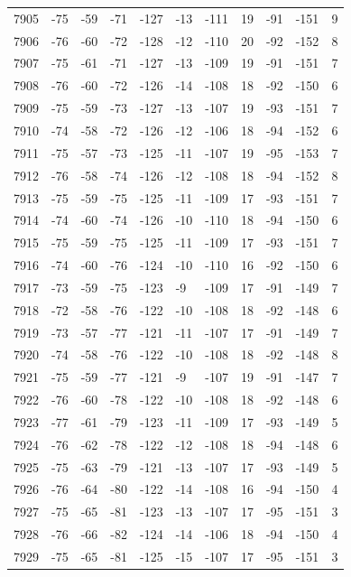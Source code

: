 \begin{table}[H]
\begin{tabular}{lllllllllll}
7905 & -75 & -59 & -71 & -127 & -13 & -111 & 19 & -91 & -151 & 9 \\
7906 & -76 & -60 & -72 & -128 & -12 & -110 & 20 & -92 & -152 & 8 \\
7907 & -75 & -61 & -71 & -127 & -13 & -109 & 19 & -91 & -151 & 7 \\
7908 & -76 & -60 & -72 & -126 & -14 & -108 & 18 & -92 & -150 & 6 \\
7909 & -75 & -59 & -73 & -127 & -13 & -107 & 19 & -93 & -151 & 7 \\
7910 & -74 & -58 & -72 & -126 & -12 & -106 & 18 & -94 & -152 & 6 \\
7911 & -75 & -57 & -73 & -125 & -11 & -107 & 19 & -95 & -153 & 7 \\
7912 & -76 & -58 & -74 & -126 & -12 & -108 & 18 & -94 & -152 & 8 \\
7913 & -75 & -59 & -75 & -125 & -11 & -109 & 17 & -93 & -151 & 7 \\
7914 & -74 & -60 & -74 & -126 & -10 & -110 & 18 & -94 & -150 & 6 \\
7915 & -75 & -59 & -75 & -125 & -11 & -109 & 17 & -93 & -151 & 7 \\
7916 & -74 & -60 & -76 & -124 & -10 & -110 & 16 & -92 & -150 & 6 \\
7917 & -73 & -59 & -75 & -123 & -9 & -109 & 17 & -91 & -149 & 7 \\
7918 & -72 & -58 & -76 & -122 & -10 & -108 & 18 & -92 & -148 & 6 \\
7919 & -73 & -57 & -77 & -121 & -11 & -107 & 17 & -91 & -149 & 7 \\
7920 & -74 & -58 & -76 & -122 & -10 & -108 & 18 & -92 & -148 & 8 \\
7921 & -75 & -59 & -77 & -121 & -9 & -107 & 19 & -91 & -147 & 7 \\
7922 & -76 & -60 & -78 & -122 & -10 & -108 & 18 & -92 & -148 & 6 \\
7923 & -77 & -61 & -79 & -123 & -11 & -109 & 17 & -93 & -149 & 5 \\
7924 & -76 & -62 & -78 & -122 & -12 & -108 & 18 & -94 & -148 & 6 \\
7925 & -75 & -63 & -79 & -121 & -13 & -107 & 17 & -93 & -149 & 5 \\
7926 & -76 & -64 & -80 & -122 & -14 & -108 & 16 & -94 & -150 & 4 \\
7927 & -75 & -65 & -81 & -123 & -13 & -107 & 17 & -95 & -151 & 3 \\
7928 & -76 & -66 & -82 & -124 & -14 & -106 & 18 & -94 & -150 & 4 \\
7929 & -75 & -65 & -81 & -125 & -15 & -107 & 17 & -95 & -151 & 3 \\

\end{tabular}
\end{table}
